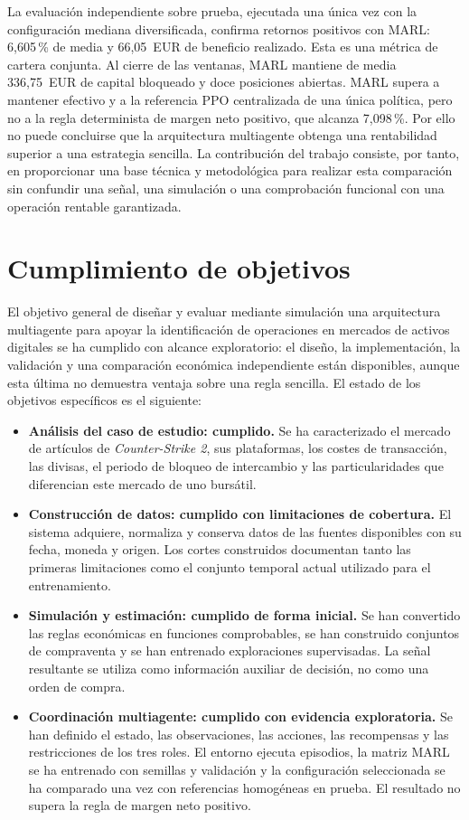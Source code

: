 La evaluación independiente sobre prueba, ejecutada una única vez con la configuración mediana diversificada, confirma retornos positivos con MARL: 6,605\,\% de media y 66,05~EUR de beneficio realizado. Esta es una métrica de cartera conjunta. Al cierre de las ventanas, MARL mantiene de media 336,75~EUR de capital bloqueado y doce posiciones abiertas. MARL supera a mantener efectivo y a la referencia PPO centralizada de una única política, pero no a la regla determinista de margen neto positivo, que alcanza 7,098\,\%. Por ello no puede concluirse que la arquitectura multiagente obtenga una rentabilidad superior a una estrategia sencilla. La contribución del trabajo consiste, por tanto, en proporcionar una base técnica y metodológica para realizar esta comparación sin confundir una señal, una simulación o una comprobación funcional con una operación rentable garantizada.

\section{Cumplimiento de objetivos}

El objetivo general de diseñar y evaluar mediante simulación una arquitectura multiagente para apoyar la identificación de operaciones en mercados de activos digitales se ha cumplido con alcance exploratorio: el diseño, la implementación, la validación y una comparación económica independiente están disponibles, aunque esta última no demuestra ventaja sobre una regla sencilla. El estado de los objetivos específicos es el siguiente:

\begin{itemize}
  \item \textbf{Análisis del caso de estudio: cumplido.} Se ha caracterizado el mercado de artículos de \textit{Counter-Strike 2}, sus plataformas, los costes de transacción, las divisas, el periodo de bloqueo de intercambio y las particularidades que diferencian este mercado de uno bursátil.
  \item \textbf{Construcción de datos: cumplido con limitaciones de cobertura.} El sistema adquiere, normaliza y conserva datos de las fuentes disponibles con su fecha, moneda y origen. Los cortes construidos documentan tanto las primeras limitaciones como el conjunto temporal actual utilizado para el entrenamiento.
  \item \textbf{Simulación y estimación: cumplido de forma inicial.} Se han convertido las reglas económicas en funciones comprobables, se han construido conjuntos de compraventa y se han entrenado exploraciones supervisadas. La señal resultante se utiliza como información auxiliar de decisión, no como una orden de compra.
  \item \textbf{Coordinación multiagente: cumplido con evidencia exploratoria.} Se han definido el estado, las observaciones, las acciones, las recompensas y las restricciones de los tres roles. El entorno ejecuta episodios, la matriz MARL se ha entrenado con semillas y validación y la configuración seleccionada se ha comparado una vez con referencias homogéneas en prueba. El resultado no supera la regla de margen neto positivo.
\end{itemize}

